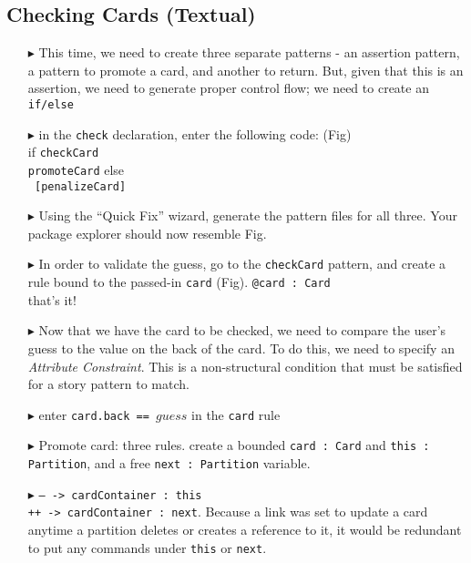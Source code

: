 \newpage
\subsection{Checking Cards (Textual)}
\texHeader
\hypertarget{checkCard tex}{}
 
 \begin{itemize}
   
\item[$\blacktriangleright$] This time, we need to create three separate patterns - an assertion pattern, a pattern to promote a card, and another to return.
But, given that this is an assertion, we need to generate proper control flow; we need to create an \texttt{if/else}

\item[$\blacktriangleright$] in the \texttt{check} declaration, enter the following code: (Fig) \\ 
if \texttt{checkCard}  { \\ \texttt{promoteCard} } else \\ \texttt{ [penalizeCard] } 

\item[$\blacktriangleright$] Using the ``Quick Fix'' wizard, generate the pattern files for all three. Your package explorer should now resemble Fig.

\item[$\blacktriangleright$] In order to validate the guess, go to the \texttt{checkCard} pattern, and create a rule bound to the passed-in \texttt{card} (Fig).
\texttt{@card : Card{ } } \\ that's it!

\item[$\blacktriangleright$] Now that we have the card to be checked, we need to compare the user's guess to the value on the back of the card. To do this, we
need to specify an \emph{Attribute Constraint}. This is a non-structural condition that must be satisfied for a story pattern to match.

\item[$\blacktriangleright$] enter \texttt{card.back == $guess$} in the \texttt{card} rule

\item[$\blacktriangleright$] Promote card: three rules. create a bounded \texttt{card : Card} and  \texttt{this : Partition}, and a free  \texttt{next :
Partition} variable.

\item[$\blacktriangleright$] \texttt{-- -> cardContainer : this \\ ++ -> cardContainer : next}. Because a link was set to update a card anytime a partition
deletes or creates a reference to it, it would be redundant to put any commands under \texttt{this} or  \texttt{next}.


\end{itemize}
